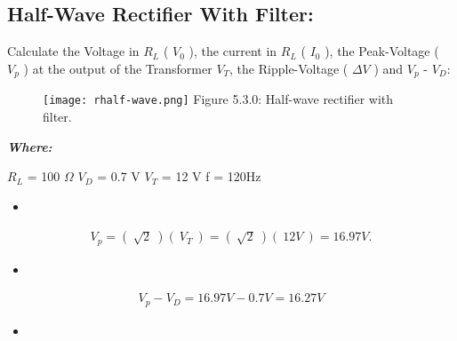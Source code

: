 \subsection{Half-Wave Rectifier With Filter:}

Calculate the Voltage in $R_{L}$ ( $V_{0}$ ), the current in $R_{L}$ ( $I_{0}$ ), the Peak-Voltage ( $V_{p}$ ) at the output of the Transformer $V_{T}$, the Ripple-Voltage ( $\Delta V$ ) and $V_{p}$ - $V_{D}$:

\begin{figure}[H]
\texttt{[image: rhalf-wave.png]}
\centering \linebreak \linebreak Figure 5.3.0: Half-wave rectifier with filter.
\end{figure}

{\bfseries\itshape Where:
\begin{tasks}
\task $R_{L}$ = 100 $\Omega$
\task $V_{D}$ = 0.7 V
\task $V_{T}$ = 12 V
\task f = 120Hz 
\end{tasks}} \hfill

{\bfseries\itshape\color{Maroon}{Solution:}} \hfill \break

\begin{itemize}
\item {\bfseries\itshape\color{Violet}{For peak voltage at the transformer output:}} \hfill \break
{\bfseries\itshape{}}
\end{itemize}

\begin{ceqn}
\begin{align}
V_{p} = (\ \sqrt{2}\ )(\ V_{T}\ ) = (\ \sqrt{2}\ )(\ 12 V\ ) = 16.97 V.
\end{align}
\end{ceqn}

\begin{itemize}
\item {\bfseries\itshape{}} \hfill \break
\end{itemize}

\begin{ceqn}
\begin{align}
V_{p} - V_{D} = 16.97V - 0.7V = 16.27 V
\end{align}
\end{ceqn}

\begin{itemize}
\item {\bfseries\itshape\color{Violet}{Using 470$\mu F$ capacitor:}} \hfill \break
{\bfseries\itshape{}}
\end{itemize}

